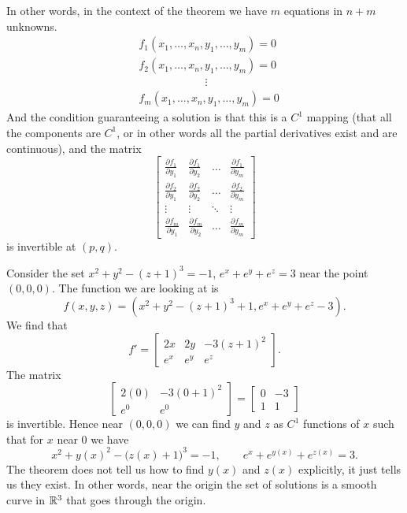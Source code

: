 In other words, in the context of the theorem we have
$m$ equations in $n+m$ unknowns.
\begin{align*}
& f_1 (x_1,\ldots,x_n,y_1,\ldots,y_m) = 0 \\
& f_2 (x_1,\ldots,x_n,y_1,\ldots,y_m) = 0 \\
& \qquad \qquad \qquad  \vdots \\
& f_m (x_1,\ldots,x_n,y_1,\ldots,y_m) = 0
\end{align*}
And the condition guaranteeing a solution is that this is a $C^1$ mapping (that all the components are
$C^1$, or in other words all the partial derivatives exist
and are continuous), and the matrix
\begin{equation*}
\begin{bmatrix}
\frac{\partial f_1}{\partial y_1}
&
\frac{\partial f_1}{\partial y_2}
& \ldots &
\frac{\partial f_1}{\partial y_m}
\\[6pt]
\frac{\partial f_2}{\partial y_1}
&
\frac{\partial f_2}{\partial y_2}
& \ldots &
\frac{\partial f_2}{\partial y_m}
\\
\vdots & \vdots & \ddots & \vdots
\\
\frac{\partial f_m}{\partial y_1}
&
\frac{\partial f_m}{\partial y_2}
& \ldots &
\frac{\partial f_m}{\partial y_m}
\end{bmatrix}
\end{equation*}
is invertible at $(p,q)$.

\begin{example}
Consider the set $x^2+y^2-{(z+1)}^3 = -1$, $e^x+e^y+e^z = 3$
near the point $(0,0,0)$.
The function we are looking at is
\begin{equation*}
f(x,y,z) = (x^2+y^2-{(z+1)}^3+1,e^x+e^y+e^z-3) .
\end{equation*}
We find that
\begin{equation*}
f' =
\begin{bmatrix}
2x & 2y & -3{(z+1)}^2 \\
e^x & e^y & e^z
\end{bmatrix} .
\end{equation*}
The matrix
\begin{equation*}
\begin{bmatrix}
2(0) & -3{(0+1)}^2 \\
e^0 & e^0
\end{bmatrix}
=
\begin{bmatrix}
0 & -3 \\
1 & 1
\end{bmatrix}
\end{equation*}
is invertible.  Hence near $(0,0,0)$ we can find $y$ and $z$
as $C^1$ functions of $x$ such that for $x$ near 0 we have
\begin{equation*}
x^2+y(x)^2-{\bigl(z(x)+1\bigr)}^3 = -1,
\qquad
e^x+e^{y(x)}+e^{z(x)} = 3 .
\end{equation*}
The theorem does not tell us how to find $y(x)$ and $z(x)$ explicitly,
it just tells us they exist.
In other words, near the origin the set of solutions is a
smooth curve in ${\mathbb{R}}^3$ that goes through the origin.
\end{example}

